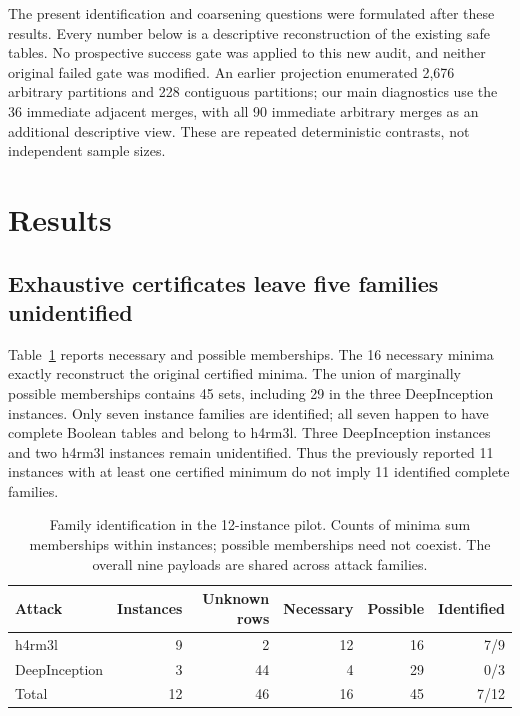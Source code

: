 \documentclass{article}
\begin{document}
The present identification and coarsening questions were formulated after
these results. Every number below is a descriptive reconstruction of the
existing safe tables. No prospective success gate was applied to this new
audit, and neither original failed gate was modified. An earlier projection
enumerated 2,676 arbitrary partitions and 228 contiguous partitions; our main
diagnostics use the 36 immediate adjacent merges, with all 90 immediate
arbitrary merges as an additional descriptive view. These are repeated
deterministic contrasts, not independent sample sizes.

\section{Results}

\subsection{Exhaustive certificates leave five families unidentified}

Table~\ref{tab:identification} reports necessary and possible memberships.
The 16 necessary minima exactly reconstruct the original certified minima.
The union of marginally possible memberships contains 45 sets, including 29
in the three DeepInception instances. Only seven instance families are
identified; all seven happen to have complete Boolean tables and belong to
h4rm3l. Three DeepInception instances and two h4rm3l instances remain
unidentified. Thus the previously reported 11 instances with at least one
certified minimum do not imply 11 identified complete families.

\begin{table}[t]
\caption{Family identification in the 12-instance pilot. Counts of minima
sum memberships within instances; possible memberships need not coexist.
The overall nine payloads are shared across attack families.}
\label{tab:identification}
\centering
\small
\begin{tabular}{lrrrrr}
\toprule
Attack & Instances & Unknown rows & Necessary & Possible & Identified \\
\midrule
h4rm3l & 9 & 2 & 12 & 16 & 7/9 \\
DeepInception & 3 & 44 & 4 & 29 & 0/3 \\
\midrule
Total & 12 & 46 & 16 & 45 & 7/12 \\
\bottomrule
\end{tabular}
\end{table}
\end{document}
